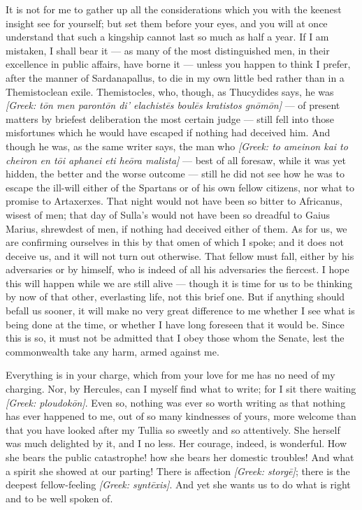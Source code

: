  It is not for me to gather up all the considerations which you with the keenest insight see for yourself; but set them before your eyes, and you will at once understand that such a kingship cannot last so much as half a year. If I am mistaken, I shall bear it --- as many of the most distinguished men, in their excellence in public affairs, have borne it --- unless you happen to think I prefer, after the manner of Sardanapallus, to die in my own little bed rather than in a Themistoclean exile. Themistocles, who, though, as Thucydides says, he was \textit{[Greek: t\=on men paront\=on di' elachist\=es boul\=es kratistos gn\=om\=on]} --- of present matters by briefest deliberation the most certain judge --- still fell into those misfortunes which he would have escaped if nothing had deceived him. And though he was, as the same writer says, the man who \textit{[Greek: to ameinon kai to cheiron en t\={o}i aphanei eti he\={o}ra malista]} --- best of all foresaw, while it was yet hidden, the better and the worse outcome --- still he did not see how he was to escape the ill-will either of the Spartans or of his own fellow citizens, nor what to promise to Artaxerxes. That night would not have been so bitter to Africanus, wisest of men; that day of Sulla's would not have been so dreadful to Gaius Marius, shrewdest of men, if nothing had deceived either of them. As for us, we are confirming ourselves in this by that omen of which I spoke; and it does not deceive us, and it will not turn out otherwise. That fellow must fall, either by his adversaries or by himself, who is indeed of all his adversaries the fiercest. I hope this will happen while we are still alive --- though it is time for us to be thinking by now of that other, everlasting life, not this brief one. But if anything should befall us sooner, it will make no very great difference to me whether I see what is being done at the time, or whether I have long foreseen that it would be. Since this is so, it must not be admitted that I obey those whom the Senate, lest the commonwealth take any harm, armed against me.

 Everything is in your charge, which from your love for me has no need of my charging. Nor, by Hercules, can I myself find what to write; for I sit there waiting \textit{[Greek: ploudok\=on]}. Even so, nothing was ever so worth writing as that nothing has ever happened to me, out of so many kindnesses of yours, more welcome than that you have looked after my Tullia so sweetly and so attentively. She herself was much delighted by it, and I no less. Her courage, indeed, is wonderful. How she bears the public catastrophe! how she bears her domestic troubles! And what a spirit she showed at our parting! There is affection \textit{[Greek: storg\=e]}; there is the deepest fellow-feeling \textit{[Greek: synt\=exis]}. And yet she wants us to do what is right and to be well spoken of.

